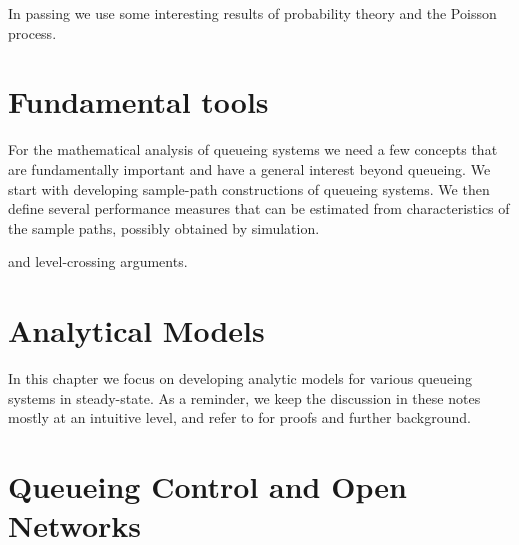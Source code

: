 In passing we use some interesting results of probability theory and the Poisson process. 







\chapter{Fundamental tools}
\label{cha:fundamental-tools}

For the mathematical analysis of queueing systems we need a few concepts that are fundamentally important and have a general interest beyond queueing.
We start with developing sample-path constructions of queueing systems.
We then define several performance measures that can be estimated from characteristics of the sample paths, possibly obtained by simulation.

 and level-crossing arguments.










\chapter{Analytical Models}
\label{cha:analytical-models}

In this chapter we focus on developing analytic models for various queueing systems in steady-state.
As a reminder, we keep the discussion in these notes mostly at an intuitive level, and refer to \cite{el-taha98:_sampl_path_analy_queuein_system} for proofs and further background.







% 
%


\chapter{Queueing Control and Open Networks}
\label{cha:queu-contr-open}

